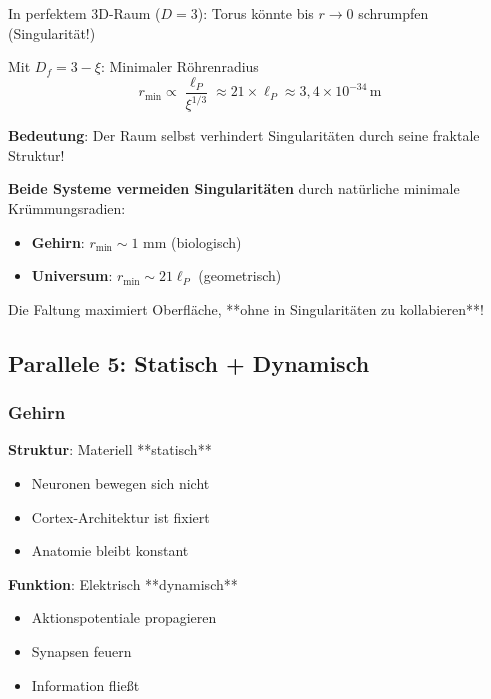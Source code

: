 	In perfektem 3D-Raum ($D=3$): Torus könnte bis $r \to 0$ schrumpfen (Singularität!)
	
	Mit $D_f = 3-\xi$: Minimaler Röhrenradius
	\begin{equation}
		r_{\min} \propto \frac{\ell_P}{\xi^{1/3}} \approx 21 \times \ell_P \approx 3,4 \times 10^{-34}\,\text{m}
	\end{equation}
	
	\textbf{Bedeutung}: Der Raum selbst verhindert Singularitäten durch seine fraktale Struktur!
	
	\begin{keyresult}
		\textbf{Beide Systeme vermeiden Singularitäten} durch natürliche minimale Krümmungsradien:
		
		\begin{itemize}
			\item \textbf{Gehirn}: $r_{\min} \sim 1$ mm (biologisch)
			\item \textbf{Universum}: $r_{\min} \sim 21 \ell_P$ (geometrisch)
		\end{itemize}
		
		Die Faltung maximiert Oberfläche, **ohne in Singularitäten zu kollabieren**!
	\end{keyresult}
	
	\subsection{Parallele 5: Statisch + Dynamisch}
	
	\subsubsection{Gehirn}
	
	\textbf{Struktur}: Materiell **statisch**
	\begin{itemize}
		\item Neuronen bewegen sich nicht
		\item Cortex-Architektur ist fixiert
		\item Anatomie bleibt konstant
	\end{itemize}
	
	\textbf{Funktion}: Elektrisch **dynamisch**
	\begin{itemize}
		\item Aktionspotentiale propagieren
		\item Synapsen feuern
		\item Information fließt
	\end{itemize}
	
